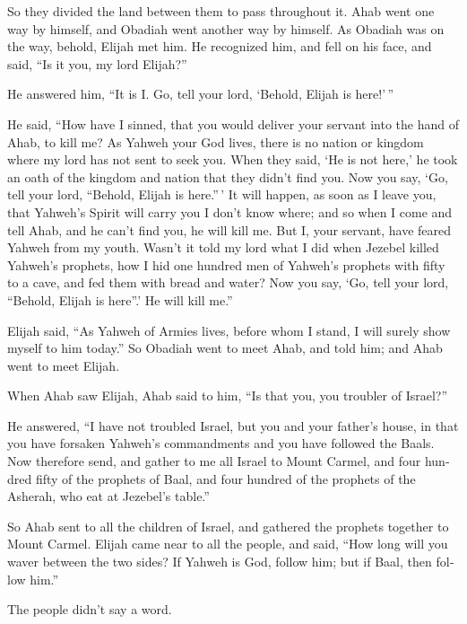 \begin{paracol}{2}
\begin{otherlanguage}{english}
 So they divided the land between them to pass throughout
it. Ahab went one way by himself, and Obadiah went another way by
himself.  As Obadiah was on the way, behold, Elijah met
him. He recognized him, and fell on his face, and said, ``Is it you, my
lord Elijah?''

 He answered him, ``It is I. Go, tell your lord, `Behold,
Elijah is here!'\,''

 He said, ``How have I sinned, that you would deliver your
servant into the hand of Ahab, to kill me?  As Yahweh
your God lives, there is no nation or kingdom where my lord has not sent
to seek you. When they said, `He is not here,' he took an oath of the
kingdom and nation that they didn't find you.  Now you
say, `Go, tell your lord, ``Behold, Elijah is here.''\,' 
It will happen, as soon as I leave you, that Yahweh's Spirit will carry
you I don't know where; and so when I come and tell Ahab, and he can't
find you, he will kill me. But I, your servant, have feared Yahweh from
my youth.  Wasn't it told my lord what I did when Jezebel
killed Yahweh's prophets, how I hid one hundred men of Yahweh's prophets
with fifty to a cave, and fed them with bread and water? 
Now you say, `Go, tell your lord, ``Behold, Elijah is here''.' He will
kill me.''

 Elijah said, ``As Yahweh of Armies lives, before whom I
stand, I will surely show myself to him today.''  So
Obadiah went to meet Ahab, and told him; and Ahab went to meet Elijah.

 When Ahab saw Elijah, Ahab said to him, ``Is that you,
you troubler of Israel?''

 He answered, ``I have not troubled Israel, but you and
your father's house, in that you have forsaken Yahweh's commandments and
you have followed the Baals.  Now therefore send, and
gather to me all Israel to Mount Carmel, and four hundred fifty of the
prophets of Baal, and four hundred of the prophets of the Asherah, who
eat at Jezebel's table.''

 So Ahab sent to all the children of Israel, and gathered
the prophets together to Mount Carmel.  Elijah came near
to all the people, and said, ``How long will you waver between the two
sides? If Yahweh is God, follow him; but if Baal, then follow him.''

The people didn't say a word.


\end{otherlanguage}
\end{paracol}
